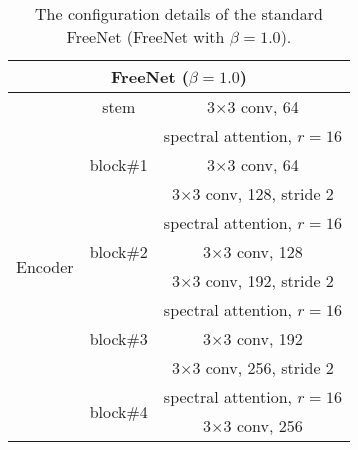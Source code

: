 \documentclass[journal]{IEEEtran}
\begin{document}
\begin{table}[htb]
  \caption{The configuration details of the standard FreeNet (FreeNet with $\beta=1.0$).
    \label{tab:freenet_setting}}
  \centering
  \renewcommand{\arraystretch}{1.5}
  \begin{tabular}{ccc}
    \hline
    \multicolumn{3}{c}{FreeNet ($\beta=1.0$)}                                                                                        \\ \hline
    \multicolumn{1}{c|}{\multirow{12}{*}{Encoder}} & \multicolumn{1}{c|}{stem}                      & 3$\times$3 conv, 64            \\ \cline{2-3}
    \multicolumn{1}{c|}{}                          & \multicolumn{1}{c|}{\multirow{3}{*}{block\#1}} & spectral attention, $r = 16$   \\
    \multicolumn{1}{c|}{}                          & \multicolumn{1}{c|}{}                          & 3$\times$3 conv, 64            \\
    \multicolumn{1}{c|}{}                          & \multicolumn{1}{c|}{}                          & 3$\times$3 conv, 128, stride 2 \\ \cline{2-3}
    \multicolumn{1}{c|}{}                          & \multicolumn{1}{c|}{\multirow{3}{*}{block\#2}} & spectral attention, $r = 16$   \\
    \multicolumn{1}{c|}{}                          & \multicolumn{1}{c|}{}                          & 3$\times$3 conv, 128           \\
    \multicolumn{1}{c|}{}                          & \multicolumn{1}{c|}{}                          & 3$\times$3 conv, 192, stride 2 \\ \cline{2-3}
    \multicolumn{1}{c|}{}                          & \multicolumn{1}{c|}{\multirow{3}{*}{block\#3}} & spectral attention, $r = 16$   \\
    \multicolumn{1}{c|}{}                          & \multicolumn{1}{c|}{}                          & 3$\times$3 conv, 192           \\
    \multicolumn{1}{c|}{}                          & \multicolumn{1}{c|}{}                          & 3$\times$3 conv, 256, stride 2 \\ \cline{2-3}
    \multicolumn{1}{c|}{}                          & \multicolumn{1}{c|}{\multirow{2}{*}{block\#4}} & spectral attention, $r = 16$   \\
    \multicolumn{1}{c|}{}                          & \multicolumn{1}{c|}{}                          & 3$\times$3 conv, 256           \\ \hline

\end{tabular}
\end{table}
\end{document}
